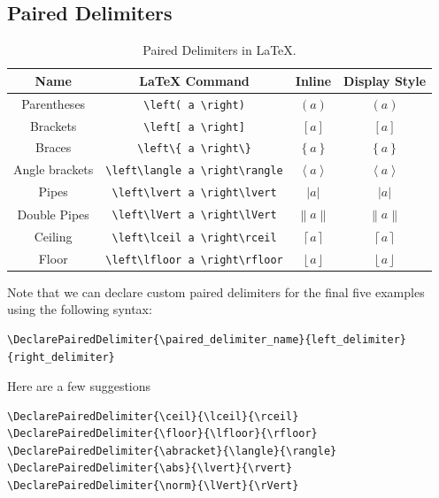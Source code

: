 \documentclass[11pt, twoside]{article}
\begin{document}
\subsection{Paired Delimiters}
\begin{table}[H]
    \centering
    \begingroup
    \renewcommand{\arraystretch}{1.2}
    \begin{tabular}{c c c c}
        \toprule
        \textbf{Name}  & \textbf{\LaTeX{} Command}                & \textbf{Inline}                  & \textbf{Display Style}                         \\
        \midrule
        Parentheses    & \lstinline|\left( a \right)|             & \(\left( a \right)\)             & \(\displaystyle \left( a \right)\)             \\ %
        Brackets       & \lstinline|\left[ a \right]|             & \(\left[ a \right]\)             & \(\displaystyle \left[ a \right]\)             \\
        Braces         & \lstinline|\left\{ a \right\}|           & \(\left\{ a \right\}\)           & \(\displaystyle \left\{ a \right\}\)           \\
        Angle brackets & \lstinline|\left\langle a \right\rangle| & \(\left\langle a \right\rangle\) & \(\displaystyle \left\langle a \right\rangle\) \\
        Pipes          & \lstinline|\left\lvert a \right\lvert|   & \(\left\lvert a \right\lvert\)   & \(\displaystyle \left\lvert a \right\lvert\)   \\
        Double Pipes   & \lstinline|\left\lVert a \right\lVert|   & \(\left\lVert a \right\lVert\)   & \(\displaystyle \left\lVert a \right\lVert\)   \\
        Ceiling        & \lstinline|\left\lceil a \right\rceil|   & \(\left\lceil a \right\rceil\)   & \(\displaystyle \left\lceil a \right\rceil\)   \\
        Floor          & \lstinline|\left\lfloor a \right\rfloor| & \(\left\lfloor a \right\rfloor\) & \(\displaystyle \left\lfloor a \right\rfloor\) \\
        \bottomrule
    \end{tabular}
    \endgroup
    \caption{Paired Delimiters in \LaTeX{}.} %
\end{table}
Note that we can declare custom paired delimiters for the final five examples using the following syntax:
\begin{lstlisting}
\DeclarePairedDelimiter{\paired_delimiter_name}{left_delimiter}{right_delimiter}
\end{lstlisting}
Here are a few suggestions
\begin{lstlisting}
\DeclarePairedDelimiter{\ceil}{\lceil}{\rceil}
\DeclarePairedDelimiter{\floor}{\lfloor}{\rfloor}
\DeclarePairedDelimiter{\abracket}{\langle}{\rangle}
\DeclarePairedDelimiter{\abs}{\lvert}{\rvert}
\DeclarePairedDelimiter{\norm}{\lVert}{\rVert}
\end{lstlisting}
\DeclarePairedDelimiter{\ceil}{\lceil}{\rceil}
\DeclarePairedDelimiter{\floor}{\lfloor}{\rfloor}
\DeclarePairedDelimiter{\abracket}{\langle}{\rangle}
\DeclarePairedDelimiter{\abs}{\lvert}{\rvert}
\DeclarePairedDelimiter{\norm}{\lVert}{\rVert}
\end{document}
